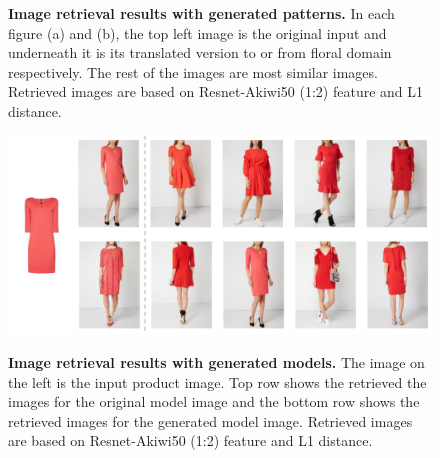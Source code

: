 \documentclass[12pt]{report}
\begin{document}
\begin{figure}[h]
\centering
{}\vspace{0.3cm}
\caption{\label{fig:search_weights} \textbf{Image retrieval results with generated patterns.} In each figure (a) and (b), the top left image is the original input and underneath it is its translated version to or from floral domain respectively. The rest of the images are most similar images. Retrieved images are based on Resnet-Akiwi50 (1:2) feature and L1 distance.}
\end{figure}

\begin{figure}[h]
\centering
{\includegraphics[width=\linewidth]{04_experiments/retrieval/generated/pix2pix_retrieval}}
\caption{\label{fig:search_weights} \textbf{Image retrieval results with generated models.} The image on the left is the input product image. Top row shows the retrieved the images for the original model image and the bottom row shows the retrieved images for the generated model image. Retrieved images are based on Resnet-Akiwi50 (1:2) feature and L1 distance.}
\end{figure}
\end{document}
